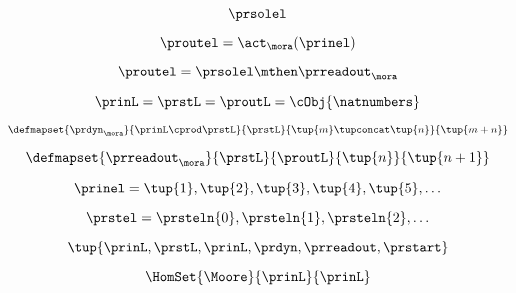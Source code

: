 \begin{forslides}
    \begin{equation}
        \label{eq:slides-processes-08}
        \prsolel
    \end{equation}

    \begin{equation}
        \label{eq:slides-processes-09}
        \proutel = \act_{\mora}(\prinel)
    \end{equation}
    
    \begin{equation}
        \label{eq:slides-processes-10}
        \proutel = \prsolel \mthen \prreadout_\mora
    \end{equation}

    \begin{equation}
        \label{eq:slides-processes-11}
        \prinL = \prstL = \proutL = \cObj{\natnumbers}
    \end{equation}

    \begin{equation}
        \label{eq:slides-processes-12}
        \defmapset{
            \prdyn_\mora
        }{
            \prinL \cprod \prstL
        }{
            \prstL
        }{
            \tup{m} \tupconcat \tup{n}
        }{
            \tup{m + n}
        }
    \end{equation}

    \begin{equation}
        \label{eq:slides-processes-13}
        \defmapset{
            \prreadout_\mora
        }{
            \prstL
        }{
            \proutL
        }{
            \tup{n}
        }{
            \tup{n+1}
        }
    \end{equation}

    \begin{equation}
        \label{eq:slides-processes-14}
        \prinel = \tup{1}, \tup{2}, \tup{3}, \tup{4}, \tup{5}, \ldots
    \end{equation}

    \begin{equation}
        \label{eq:slides-processes-15}
        \prstel = \prsteln{0}, \prsteln{1}, \prsteln{2}, \ldots
    \end{equation}

    \begin{equation}
        \label{eq:slides-processes-16}
        \tup{\prinL,\prstL,\prinL,\prdyn,\prreadout,\prstart}
    \end{equation}

    \begin{equation}
        \label{eq:slides-processes-17}
        \HomSet{\Moore}{\prinL}{\prinL}
    \end{equation}


\end{forslides}
